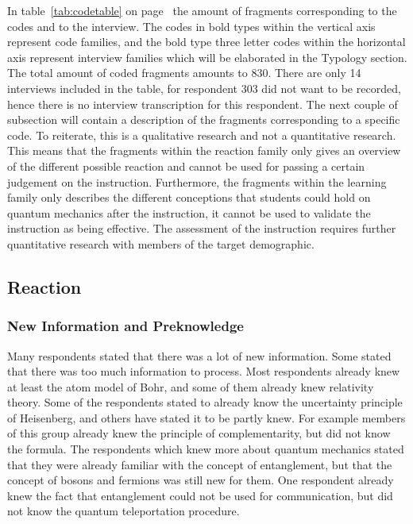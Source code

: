 \documentclass[11pt,twoside]{report} %
\begin{document}
In table~\ref{tab:codetable} on page~\pageref{tab:codetable} the amount of fragments corresponding to the codes and to the interview. The codes in bold types within the vertical axis represent code families, and the bold type three letter codes within the horizontal axis represent interview families which will be elaborated in the Typology section. The total amount of coded fragments amounts to 830. There are only 14 interviews included in the table, for respondent 303 did not want to be recorded, hence there is no interview transcription for this respondent. The next couple of subsection will contain a description of the fragments corresponding to a specific code. To reiterate, this is a qualitative research and not a quantitative research. This means that the fragments within the reaction family only gives an overview of the different possible reaction and cannot be used for passing a certain judgement on the instruction. Furthermore, the fragments within the learning family only describes the different conceptions that students could hold on quantum mechanics after the instruction, it cannot be used to validate the instruction as being effective. The assessment of the instruction requires further quantitative research with members of the target demographic.

\subsection{Reaction}

\subsubsection{New Information and Preknowledge}

Many respondents stated that there was a lot of new information. Some stated that there was too much information to process. Most respondents already knew at least the atom model of Bohr, and some of them already knew relativity theory. Some of the respondents stated to already know the uncertainty principle of Heisenberg, and others have stated it to be partly knew. For example members of this group already knew the principle of complementarity, but did not know the formula. The respondents which knew more about quantum mechanics stated that they were already familiar with the concept of entanglement, but that the concept of bosons and fermions was still new for them. One respondent already knew the fact that entanglement could not be used for communication, but did not know the quantum teleportation procedure.
\end{document}
